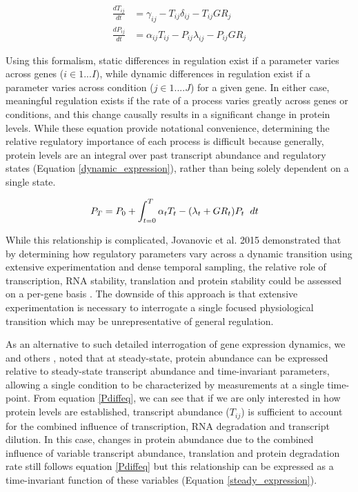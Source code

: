 \begin{subequations}
\begin{align}
\frac{dT_{ij}}{dt} &= \gamma_{ij} - T_{ij}\delta_{ij} - T_{ij}GR_{j}\label{Tdiffeq}\\
\frac{dP_{ij}}{dt} &= \alpha_{ij}T_{ij} - P_{ij}\lambda_{ij} - P_{ij}GR_{j}\label{Pdiffeq}
\end{align}
\end{subequations}

Using this formalism, static differences in regulation exist if a parameter varies across genes ($i \in 1 ... I$), while dynamic differences in regulation exist if a parameter varies across condition ($j \in 1....J$) for a given gene.  In either case, meaningful regulation exists if the rate of a process varies greatly across genes or conditions, and this change causally results in a significant change in protein levels. While these equation provide notational convenience, determining the relative regulatory importance of each process is difficult because generally, protein levels are an integral over past transcript abundance and regulatory states (Equation \ref{dynamic_expression}), rather than being solely dependent on a single state.

\begin{align}
P_{T} &= P_{0} + \int_{t = 0}^{T} \alpha_{t} T_{t} - (\lambda_{t} + GR_{t}) P_{t} \hspace{2mm} dt \label{dynamic_expression}
\end{align}

While this relationship is complicated, Jovanovic et al. 2015 demonstrated that by determining how regulatory parameters vary across a dynamic transition using extensive experimentation and dense temporal sampling, the relative role of transcription, RNA stability, translation and protein stability could be assessed on a per-gene basis \cite{Jovanovic:2015hp}. The downside of this approach is that extensive experimentation is necessary to interrogate a single focused physiological transition which may be unrepresentative of general regulation.

As an alternative to such detailed interrogation of gene expression dynamics, we and others \cite{Belle:2006hv, Csardi:2015kx}, noted that at steady-state, protein abundance can be expressed relative to steady-state transcript abundance and time-invariant parameters, allowing a single condition to be characterized by measurements at a single time-point.  From equation \ref{Pdiffeq}, we can see that if we are only interested in how protein levels are established, transcript abundance ($T_{ij}$) is sufficient to account for the combined influence of transcription, RNA degradation and transcript dilution. In this case, changes in protein abundance due to the combined influence of variable transcript abundance, translation and protein degradation rate still follows equation \ref{Pdiffeq} but this relationship can be expressed as a time-invariant function of these variables (Equation \ref{steady_expression}).

